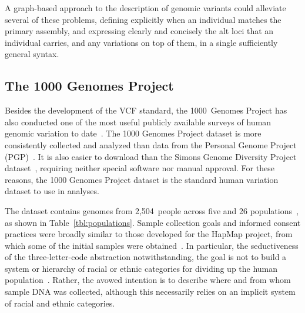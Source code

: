 A graph-based approach to the description of genomic variants could alleviate several of these problems, defining explicitly when an individual matches the primary assembly, and expressing clearly and concisely the alt loci that an individual carries, and any variations on top of them, in a single sufficiently general syntax.

\subsection{The 1000 Genomes Project}

Besides the development of the VCF standard, the 1000~Genomes Project has also conducted one of the most useful publicly available surveys of human genomic variation to date~\cite{10002015global}. The 1000 Genomes Project dataset is more consistently collected and analyzed than data from the Personal Genome Project (PGP)~\cite{church2005personal}. It is also easier to download than the Simons Genome Diversity Project dataset~\cite{simons2017simons}, requiring neither special software nor manual approval. For these reasons, the 1000 Genomes Project dataset is the standard human variation dataset to use in analyses.

The dataset contains genomes from 2,504~people across five  and 26 populations~\cite{10002015global}, as shown in Table~\ref{tbl:populations}. Sample collection goals and informed consent practices were broadly similar to those developed for the HapMap project, from which some of the initial samples were obtained~\cite{international2004integrating}. In particular, the seductiveness of the three-letter-code abstraction notwithstanding, the goal is not to build a system or hierarchy of racial or ethnic categories for dividing up the human population~\cite{international2004integrating}. Rather, the avowed intention is to describe where and from whom sample DNA was collected, although this necessarily relies on an implicit system of racial and ethnic categories.


